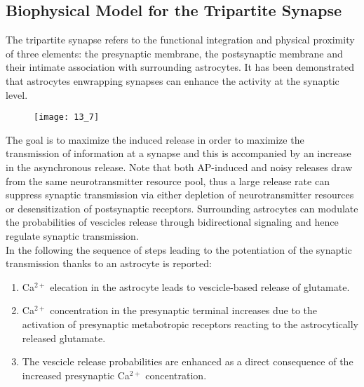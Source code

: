 \subsection{Biophysical Model for the Tripartite Synapse}
The tripartite synapse refers to the functional integration and physical proximity of
three elements: the presynaptic membrane, the postsynaptic membrane and their intimate
association with surrounding astrocytes. It has been demonstrated that astrocytes
enwrapping synapses can enhance the activity at the synaptic level.
\begin{figure}[H]
    \texttt{[image: 13\_7]}
    \centering
\end{figure}
The goal is to maximize the induced release in order to maximize the transmission of
information at a synapse and this is accompanied by an increase in the asynchronous
release. Note that both AP-induced and noisy releases draw from the same neurotransmitter
resource pool, thus a large release rate can suppress synaptic transmission via either
depletion of neurotransmitter resources or desensitization of postsynaptic receptors.
Surrounding astrocytes can modulate the probabilities of vescicles release through
bidirectional signaling and hence regulate synaptic transmission.\\
In the following the sequence of steps leading to the potentiation
of the synaptic transmission thanks to an astrocyte is reported:
\begin{enumerate}
    \item Ca\({}^{2+}\) elecation in the astrocyte leads to vescicle-based release of
          glutamate.
    \item Ca\({}^{2+}\) concentration in the presynaptic terminal increases
          due to the activation of presynaptic metabotropic receptors reacting to
          the astrocytically released glutamate.
    \item The vescicle release probabilities are enhanced as a direct consequence
          of the increased presynaptic Ca\({}^{2+}\) concentration.
\end{enumerate}
